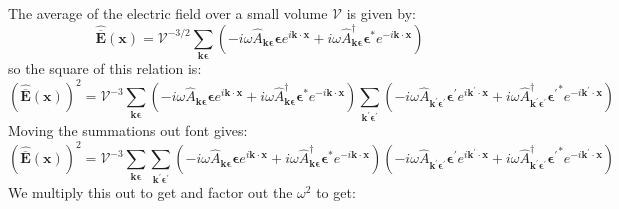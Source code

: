 \documentclass[12pt]{article}
\begin{document}
\subsection{}
The average of the electric field over a small volume $\mathcal{V}$ is given by:
\begin{equation}
  \hat{\overline{\mathbf{E}}}(\mathbf{x})=\mathcal{V}^{-3/2}\sum_{\mathbf{k} \boldsymbol{\epsilon}}\left(-i \omega \hat{A}_{\mathbf{k} \boldsymbol{\epsilon}} \boldsymbol{\epsilon} e^{i \mathbf{k} \cdot \mathbf{x}}+i \omega \hat{A}_{\mathbf{k} \boldsymbol{\epsilon}}^{\dagger} \boldsymbol{\epsilon}^{*} e^{-i \mathbf{k} \cdot \mathbf{x}}\right)
\end{equation}
so the square of this relation is:
\begin{equation}
  (\hat{\overline{\mathbf{E}}}(\mathbf{x}))^2=\mathcal{V}^{-3}\sum_{\mathbf{k} \boldsymbol{\epsilon}}\left(-i \omega \hat{A}_{\mathbf{k} \boldsymbol{\epsilon}} \boldsymbol{\epsilon} e^{i \mathbf{k} \cdot \mathbf{x}}+i \omega \hat{A}_{\mathbf{k} \boldsymbol{\epsilon}}^{\dagger} \boldsymbol{\epsilon}^{*} e^{-i \mathbf{k} \cdot \mathbf{x}}\right)\sum_{\mathbf{k^{\prime}} \boldsymbol{\epsilon^{\prime}}}\left(-i \omega \hat{A}_{\mathbf{k^{\prime}} \boldsymbol{\epsilon^{\prime}}} \boldsymbol{\epsilon^{\prime}} e^{i \mathbf{k^{\prime}} \cdot \mathbf{x}}+i \omega \hat{A}_{\mathbf{k^{\prime}} \boldsymbol{\epsilon^{\prime}}}^{\dagger} \boldsymbol{\epsilon^{\prime}}^{*} e^{-i \mathbf{k^{\prime}} \cdot \mathbf{x}}\right)
\end{equation}
Moving the summations out font gives:
\begin{equation}
  (\hat{\overline{\mathbf{E}}}(\mathbf{x}))^2=\mathcal{V}^{-3}\sum_{\mathbf{k} \boldsymbol{\epsilon}}\sum_{\mathbf{k^{\prime}} \boldsymbol{\epsilon^{\prime}}}\left(-i \omega \hat{A}_{\mathbf{k} \boldsymbol{\epsilon}} \boldsymbol{\epsilon} e^{i \mathbf{k} \cdot \mathbf{x}}+i \omega \hat{A}_{\mathbf{k} \boldsymbol{\epsilon}}^{\dagger} \boldsymbol{\epsilon}^{*} e^{-i \mathbf{k} \cdot \mathbf{x}}\right)\left(-i \omega \hat{A}_{\mathbf{k^{\prime}} \boldsymbol{\epsilon^{\prime}}} \boldsymbol{\epsilon^{\prime}} e^{i \mathbf{k^{\prime}} \cdot \mathbf{x}}+i \omega \hat{A}_{\mathbf{k^{\prime}} \boldsymbol{\epsilon^{\prime}}}^{\dagger} \boldsymbol{\epsilon^{\prime}}^{*} e^{-i \mathbf{k^{\prime}} \cdot \mathbf{x}}\right)
\end{equation}
We multiply this out to get and factor out the $\omega^2$ to get:
\end{document}
